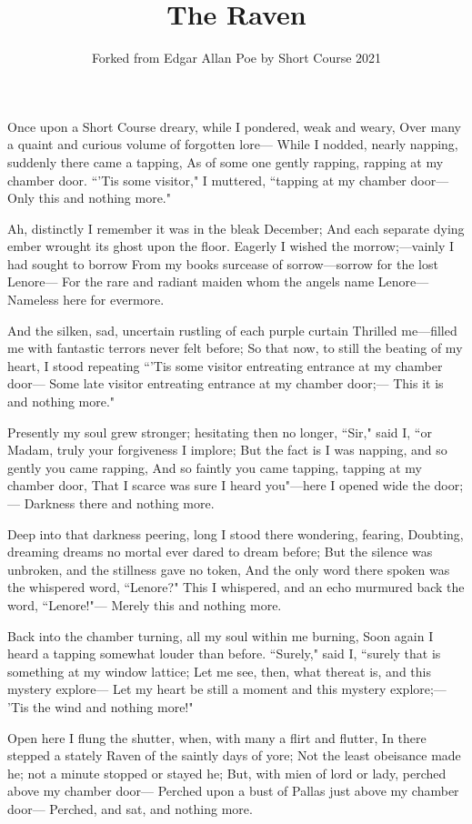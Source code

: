 \documentclass{article}
\title{The Raven}
\author{Forked from Edgar Allan Poe by Short Course 2021}
\begin{document}
\maketitle

Once upon a Short Course dreary, while I pondered, weak and weary,
Over many a quaint and curious volume of forgotten lore---
  While I nodded, nearly napping, suddenly there came a tapping,
As of some one gently rapping, rapping at my chamber door.
``’Tis some visitor," I muttered, ``tapping at my chamber door---
Only this and nothing more."

Ah, distinctly I remember it was in the bleak December;
And each separate dying ember wrought its ghost upon the floor.
Eagerly I wished the morrow;---vainly I had sought to borrow
From my books surcease of sorrow---sorrow for the lost Lenore---
For the rare and radiant maiden whom the angels name Lenore---
Nameless here for evermore.

And the silken, sad, uncertain rustling of each purple curtain
Thrilled me---filled me with fantastic terrors never felt before;
So that now, to still the beating of my heart, I stood repeating
``’Tis some visitor entreating entrance at my chamber door---
Some late visitor entreating entrance at my chamber door;---
This it is and nothing more."

Presently my soul grew stronger; hesitating then no longer,
``Sir," said I, ``or Madam, truly your forgiveness I implore;
But the fact is I was napping, and so gently you came rapping,
And so faintly you came tapping, tapping at my chamber door,
That I scarce was sure I heard you"---here I opened wide the door;---
Darkness there and nothing more.

Deep into that darkness peering, long I stood there wondering, fearing,
Doubting, dreaming dreams no mortal ever dared to dream before;
But the silence was unbroken, and the stillness gave no token,
And the only word there spoken was the whispered word, ``Lenore?"
This I whispered, and an echo murmured back the word, ``Lenore!"---
Merely this and nothing more.

Back into the chamber turning, all my soul within me burning,
Soon again I heard a tapping somewhat louder than before.
``Surely," said I, ``surely that is something at my window lattice;
Let me see, then, what thereat is, and this mystery explore---
Let my heart be still a moment and this mystery explore;---
’Tis the wind and nothing more!"

Open here I flung the shutter, when, with many a flirt and flutter,
In there stepped a stately Raven of the saintly days of yore;
Not the least obeisance made he; not a minute stopped or stayed he;
But, with mien of lord or lady, perched above my chamber door---
Perched upon a bust of Pallas just above my chamber door---
Perched, and sat, and nothing more.
\end{document}
